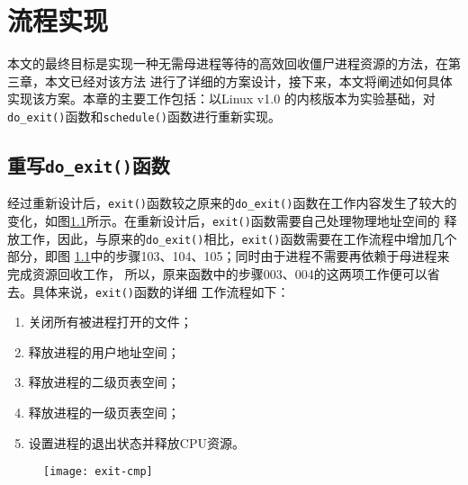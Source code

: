 \documentclass{swfuthesism}
\begin{document}
\chapter{流程实现}

本文的最终目标是实现一种无需母进程等待的高效回收僵尸进程资源的方法，在第三章，本文已经对该方法
进行了详细的方案设计，接下来，本文将阐述如何具体实现该方案。本章的主要工作包括：以Linux v1.0
的内核版本为实验基础，对\texttt{do\_exit()}函数和\texttt{schedule()}函数进行重新实现。   

\section{重写\texttt{do\_exit()}函数}

经过重新设计后，\texttt{exit()}函数较之原来的\texttt{do\_exit()}函数在工作内容发生了较大的
变化，如图\ref{fig:exit_cmp}所示。在重新设计后，\texttt{exit()}函数需要自己处理物理地址空间的
释放工作，因此，与原来的\texttt{do\_exit()}相比，\texttt{exit()}函数需要在工作流程中增加几个部分，即图
\ref{fig:exit_cmp}中的步骤103、104、105；同时由于进程不需要再依赖于母进程来完成资源回收工作，
所以，原来函数中的步骤003、004的这两项工作便可以省去。具体来说，\texttt{exit()}函数的详细
工作流程如下：
\begin{enumerate}
\item 关闭所有被进程打开的文件；
\item 释放进程的用户地址空间；
\item 释放进程的二级页表空间；
\item 释放进程的一级页表空间；
\item 设置进程的退出状态并释放CPU资源。
\end{enumerate}

\begin{figure}
  \centering
  \texttt{[image: exit-cmp]}
  \label{fig:exit_cmp}
\end{figure}
\end{document}
